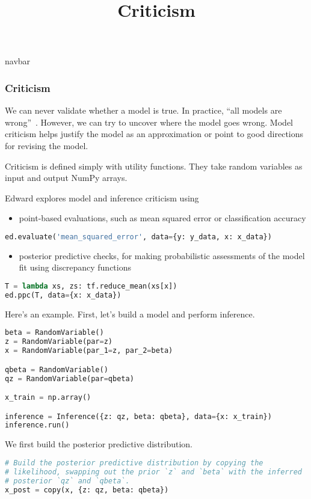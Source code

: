 \title{Criticism}

{{navbar}}

\subsubsection{Criticism}

We can never validate whether a model is true. In practice, ``all
models are wrong''~\citep{box1976science}. However, we can try to
uncover where the model goes wrong. Model criticism helps justify the
model as an approximation or point to good directions for revising the
model.

Criticism is defined simply with utility functions. They take random
variables as input and output NumPy arrays.

Edward explores model and inference criticism using
\begin{itemize}
  \item point-based evaluations, such as mean squared error or
  classification accuracy
\end{itemize}
\begin{lstlisting}[language=Python]
ed.evaluate('mean_squared_error', data={y: y_data, x: x_data})
\end{lstlisting}
\begin{itemize}
  \item posterior predictive checks, for making probabilistic
  assessments of the model fit using discrepancy functions
\end{itemize}
\begin{lstlisting}[language=Python]
T = lambda xs, zs: tf.reduce_mean(xs[x])
ed.ppc(T, data={x: x_data})
\end{lstlisting}

Here's an example. First, let's build a model and perform
inference.
\begin{lstlisting}[language=Python]
beta = RandomVariable()
z = RandomVariable(par=z)
x = RandomVariable(par_1=z, par_2=beta)

qbeta = RandomVariable()
qz = RandomVariable(par=qbeta)

x_train = np.array()

inference = Inference({z: qz, beta: qbeta}, data={x: x_train})
inference.run()
\end{lstlisting}
We first build the posterior predictive distribution.
\begin{lstlisting}[language=Python]
# Build the posterior predictive distribution by copying the
# likelihood, swapping out the prior `z` and `beta` with the inferred
# posterior `qz` and `qbeta`.
x_post = copy(x, {z: qz, beta: qbeta})
\end{lstlisting}

